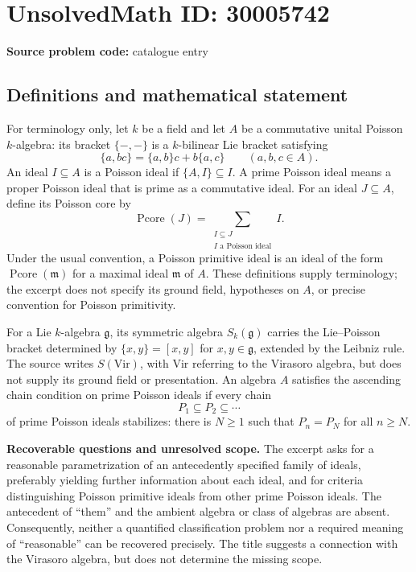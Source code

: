 \documentclass[11pt]{article}
\begin{document}
\section*{UnsolvedMath ID: 30005742}
\textbf{Source problem code:} catalogue entry
\subsection{Definitions and mathematical statement}
For terminology only, let \(k\) be a field and let \(A\) be a commutative unital Poisson \(k\)-algebra: its bracket \(\{-,-\}\) is a \(k\)-bilinear Lie bracket satisfying
\[
\{a,bc\}=\{a,b\}c+b\{a,c\}\qquad(a,b,c\in A).
\]
An ideal \(I\subseteq A\) is a Poisson ideal if \(\{A,I\}\subseteq I\). A prime Poisson ideal means a proper Poisson ideal that is prime as a commutative ideal. For an ideal \(J\subseteq A\), define its Poisson core by
\[
\operatorname{Pcore}(J)=\sum_{\substack{I\subseteq J\\ I\text{ a Poisson ideal}}}I.
\]
Under the usual convention, a Poisson primitive ideal is an ideal of the form \(\operatorname{Pcore}(\mathfrak m)\) for a maximal ideal \(\mathfrak m\) of \(A\). These definitions supply terminology; the excerpt does not specify its ground field, hypotheses on \(A\), or precise convention for Poisson primitivity.

For a Lie \(k\)-algebra \(\mathfrak g\), its symmetric algebra \(S_k(\mathfrak g)\) carries the Lie--Poisson bracket determined by \(\{x,y\}=[x,y]\) for \(x,y\in\mathfrak g\), extended by the Leibniz rule. The source writes \(S(\mathrm{Vir})\), with \(\mathrm{Vir}\) referring to the Virasoro algebra, but does not supply its ground field or presentation. An algebra \(A\) satisfies the ascending chain condition on prime Poisson ideals if every chain
\[
P_1\subseteq P_2\subseteq\cdots
\]
of prime Poisson ideals stabilizes: there is \(N\geq1\) such that \(P_n=P_N\) for all \(n\geq N\).

\textbf{Recoverable questions and unresolved scope.} The excerpt asks for a reasonable parametrization of an antecedently specified family of ideals, preferably yielding further information about each ideal, and for criteria distinguishing Poisson primitive ideals from other prime Poisson ideals. The antecedent of ``them'' and the ambient algebra or class of algebras are absent. Consequently, neither a quantified classification problem nor a required meaning of ``reasonable'' can be recovered precisely. The title suggests a connection with the Virasoro algebra, but does not determine the missing scope.
\end{document}
